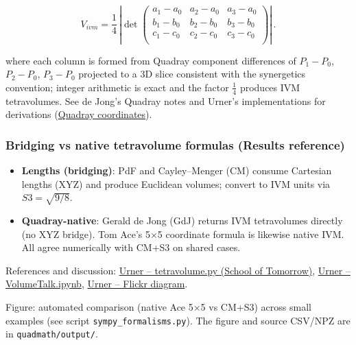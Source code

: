 \documentclass[
  10pt,
]{article}
\providecommand{\tightlist}{%
  \setlength{\itemsep}{0pt}\setlength{\parskip}{0pt}}
\begin{document}
\begin{itemize}
  \begin{equation}\label{eq:gdj}
  V_{ivm} = \frac{1}{4}\,\left|\det \begin{pmatrix}
  a_1-a_0 & a_2-a_0 & a_3-a_0 \\
  b_1-b_0 & b_2-b_0 & b_3-b_0 \\
  c_1-c_0 & c_2-c_0 & c_3-c_0 \\
  \end{pmatrix}\right|\,.
  \end{equation}

  where each column is formed from Quadray component differences of
  \(P_1-P_0\), \(P_2-P_0\), \(P_3-P_0\) projected to a 3D slice
  consistent with the synergetics convention; integer arithmetic is
  exact and the factor \(\tfrac{1}{4}\) produces IVM tetravolumes. See
  de Jong's Quadray notes and Urner's implementations for derivations
  (\href{https://en.wikipedia.org/wiki/Quadray_coordinates}{Quadray
  coordinates}).
\end{itemize}

\hypertarget{bridging-vs-native-tetravolume-formulas-results-reference}{%
\subsubsection{Bridging vs native tetravolume formulas (Results
reference)}\label{bridging-vs-native-tetravolume-formulas-results-reference}}

\begin{itemize}
\tightlist
\item
  \textbf{Lengths (bridging)}: PdF and Cayley--Menger (CM) consume
  Cartesian lengths (XYZ) and produce Euclidean volumes; convert to IVM
  units via \(S3 = \sqrt{9/8}\).
\item
  \textbf{Quadray-native}: Gerald de Jong (GdJ) returns IVM tetravolumes
  directly (no XYZ bridge). Tom Ace's 5×5 coordinate formula is likewise
  native IVM. All agree numerically with CM+S3 on shared cases.
\end{itemize}

References and discussion:
\href{https://github.com/4dsolutions/School_of_Tomorrow/blob/master/tetravolume.py}{Urner
-- tetravolume.py (School of Tomorrow)},
\href{https://github.com/4dsolutions/School_of_Tomorrow/blob/master/VolumeTalk.ipynb}{Urner
-- VolumeTalk.ipynb}, \href{https://flic.kr/p/2rn22en}{Urner -- Flickr
diagram}.

Figure: automated comparison (native Ace 5×5 vs CM+S3) across small
examples (see script \texttt{sympy\_formalisms.py}). The figure and
source CSV/NPZ are in \texttt{quadmath/output/}.
\end{document}

